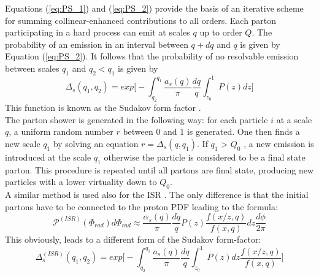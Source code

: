 \indent Equations (\ref{eq:PS_1}) and (\ref{eq:PS_2}) provide the basis of an iterative scheme for summing collinear-enhanced contributions to all orders. Each parton participating in a hard process can emit at scales $q$ up to order $Q$. The probability of an emission in an interval between $q+dq$ and $q$ is given by Equation (\ref{eq:PS_2}). It follows that the probability of no resolvable emission between scales $q_1$ and $q_2 < q_1$ is given by
\begin{equation}
    \Delta_s(q_1,q_2) = exp\bigg[-\int_{q_2}^{q_1} \frac{a_s(q)}{\pi}\frac{dq}{q}\int_{z_0}^1P(z)dz\bigg]
\end{equation}
This function is known as the Sudakov form factor \cite{Sudakov:1954sw,Collins:1989bt}.\\
\indent The parton shower is generated in the following way:  for each particle $i$ at a scale $q$, a uniform random number $r$ between 0 and 1 is generated. One then finds a new scale $q_1$ by solving an equation $r = \Delta_s(q, q_1)$. If $q_1$ > $Q_0$ , a new emission is introduced at the scale $q_1$ otherwise the particle is considered to be a final state parton. This procedure is repeated until all partons are final state, producing new particles with a lower virtuality down to $Q_0$.\\
\indent A similar method is used also for the ISR \cite{Sjostrand:1985xi}. The only difference is that the initial partons have to be connected to the proton PDF leading to the formula:
\begin{equation}
    \mathscr{P}^{(ISR)}(\Phi_{rad})d\Phi_{rad} \approx \frac{\alpha_s(q)}{\pi}\frac{dq}{q}P(z)\frac{f(x/z,q)}{f(x,q)}dz\frac{d\phi}{2\pi}
\end{equation}
This obviously, leads to a different form of the Sudakov form-factor:
\begin{equation}
    \Delta_s^{(ISR)}(q_1,q_2) = exp\bigg[-\int_{q_2}^{q_1} \frac{a_s(q)}{\pi}\frac{dq}{q}\int_{z_0}^1P(z)dz\frac{f(x/z,q)}{f(x,q)}\bigg]
\end{equation}
